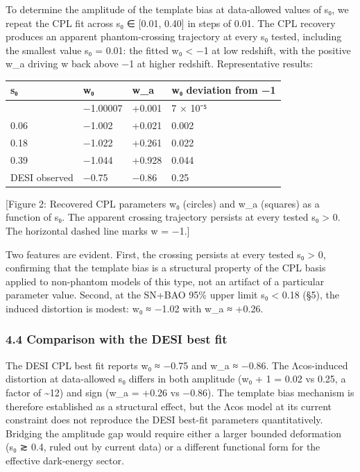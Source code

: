 To determine the amplitude of the template bias at data-allowed values
of s₀, we repeat the CPL fit across s₀ ∈ {[}0.01, 0.40{]} in steps of
0.01. The CPL recovery produces an apparent phantom-crossing trajectory
at every s₀ tested, including the smallest value s₀ = 0.01: the fitted
w₀ \textless{} −1 at low redshift, with the positive w\_a driving w back
above −1 at higher redshift. Representative results:

{\def\LTcaptype{none} %
\begin{longtable}[]{@{}llll@{}}
\toprule\noalign{}
s₀ & w₀ & w\_a & w₀ deviation from −1 \\
\midrule\noalign{}
\endhead
\bottomrule\noalign{}
\endlastfoot
0.01 & −1.00007 & +0.001 & 7 × 10⁻⁵ \\
0.06 & −1.002 & +0.021 & 0.002 \\
0.18 & −1.022 & +0.261 & 0.022 \\
0.39 & −1.044 & +0.928 & 0.044 \\
DESI observed & −0.75 & −0.86 & 0.25 \\
\end{longtable}
}

{[}Figure 2: Recovered CPL parameters w₀ (circles) and w\_a (squares) as
a function of s₀. The apparent crossing trajectory persists at every
tested s₀ \textgreater{} 0. The horizontal dashed line marks w = −1.{]}

Two features are evident. First, the crossing persists at every tested
s₀ \textgreater{} 0, confirming that the template bias is a structural
property of the CPL basis applied to non-phantom models of this type,
not an artifact of a particular parameter value. Second, at the SN+BAO
95\% upper limit s₀ \textless{} 0.18 (§5), the induced distortion is
modest: w₀ ≈ −1.02 with w\_a ≈ +0.26.

\subsubsection{4.4 Comparison with the DESI best
fit}\label{comparison-with-the-desi-best-fit}

The DESI CPL best fit reports w₀ ≈ −0.75 and w\_a ≈ −0.86. The
Λcos-induced distortion at data-allowed s₀ differs in both amplitude
(\textbar w₀ + 1\textbar{} = 0.02 vs 0.25, a factor of
\textasciitilde12) and sign (w\_a = +0.26 vs −0.86). The template bias
mechanism is therefore established as a structural effect, but the Λcos
model at its current constraint does not reproduce the DESI best-fit
parameters quantitatively. Bridging the amplitude gap would require
either a larger bounded deformation (s₀ ≳ 0.4, ruled out by current
data) or a different functional form for the effective dark-energy
sector.

